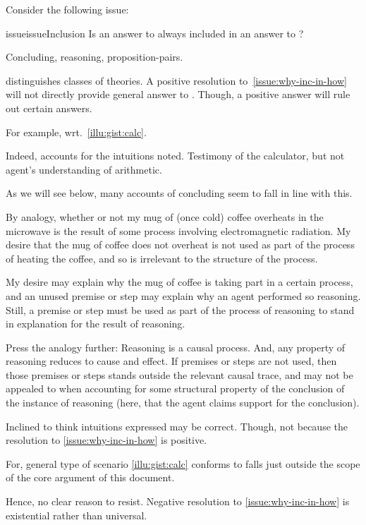 \begin{note}
  Consider the following issue:

  \begin{restatable}[Inclusion]{issue}{issueInclusion}
    \label{issue:why-inc-in-how}
    Is an answer to \qWhy{} always included in an answer to \qHow{}?
  \end{restatable}

  Concluding, reasoning, proposition-pairs.

   distinguishes classes of theories.
  A positive resolution to~\autoref{issue:why-inc-in-how} will not directly provide general answer to \qWhy{}.
  Though, a positive answer will rule out certain answers.

  For example, wrt.~\autoref{illu:gist:calc}.

  Indeed, accounts for the intuitions noted.
  Testimony of the calculator, but not agent's understanding of arithmetic.

  As we will see below, many accounts of concluding seem to fall in line with this.
\end{note}

\begin{note}[Analogy]
  By analogy, whether or not my mug of (once cold) coffee overheats in the microwave is the result of some process involving electromagnetic radiation.
  My desire that the mug of coffee does not overheat is not used as part of the process of heating the coffee, and so is irrelevant to the structure of the process.

  My desire may explain why the mug of coffee is taking part in a certain process, and an unused premise or step may explain why an agent performed so reasoning.
  Still, a premise or step must be used as part of the process of reasoning to stand in explanation for the result of reasoning.

  Press the analogy further: Reasoning is a causal process.
  And, any property of reasoning reduces to cause and effect.
  If premises or steps are not used, then those premises or steps stands outside the relevant causal trace, and may not be appealed to when accounting for some structural property of the conclusion of the instance of reasoning (here, that the agent claims support for the conclusion).
\end{note}

\begin{note}
  Inclined to think intuitions expressed may be correct.
  Though, not because the resolution to \autoref{issue:why-inc-in-how} is positive.

  For, general type of scenario \autoref{illu:gist:calc} conforms to falls just outside the scope of the core argument of this document.

  Hence, no clear reason to resist.
  Negative resolution to \autoref{issue:why-inc-in-how} is existential rather than universal.
\end{note}

